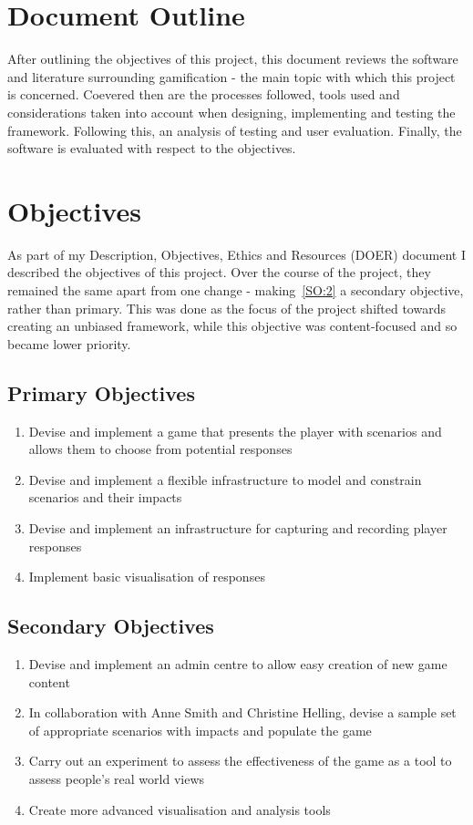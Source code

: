 \section{Document Outline}
After outlining the objectives of this project, this document reviews the software and literature surrounding gamification - the main topic with which this project is concerned.
Coevered then are the processes followed, tools used and considerations taken into account when designing, implementing and testing the framework. 
Following this, an analysis of testing and user evaluation.
Finally, the software is evaluated with respect to the objectives.

\section{Objectives}
As part of my Description, Objectives, Ethics and Resources (DOER) document I described the objectives of this project. Over the course of the project, they remained the same apart from one change - making~\ref{SO:2} a secondary objective, rather than primary. This was done as the focus of the project shifted towards creating an unbiased framework, while this objective was content-focused and so became lower priority.

\subsection{Primary Objectives}
\begin{enumerate}[label=\textbf{PO.\arabic*}]
    \item Devise and implement a game that presents the player with scenarios and allows them to choose from potential responses
    \item Devise and implement a flexible infrastructure to model and constrain scenarios and their impacts
    \item Devise and implement an infrastructure for capturing and recording player responses
    \item Implement basic visualisation of responses
\end{enumerate}
\subsection{Secondary Objectives}
\begin{enumerate}[label=\textbf{SO.\arabic*}]
    \item Devise and implement an admin centre to allow easy creation of new game content
    \item \label{SO:2} In collaboration with Anne Smith and Christine Helling, devise a sample set of appropriate scenarios with impacts and populate the game
    \item Carry out an experiment to assess the effectiveness of the game as a tool to assess people's real world views
    \item Create more advanced visualisation and analysis tools
\end{enumerate}
